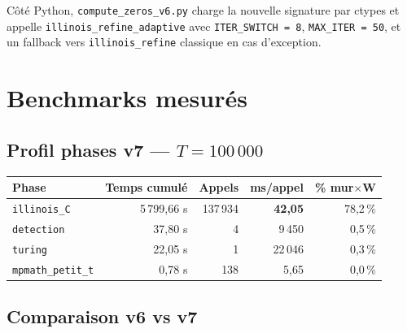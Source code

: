 \documentclass[11pt,a4paper]{article}
\begin{document}
Côté Python, \texttt{compute\_zeros\_v6.py} charge la nouvelle signature par ctypes
et appelle \texttt{illinois\_refine\_adaptive} avec \texttt{ITER\_SWITCH = 8},
\texttt{MAX\_ITER = 50}, et un fallback vers \texttt{illinois\_refine} classique en cas
d'exception.

\section{Benchmarks mesurés}

\subsection{Profil phases v7 --- $T = 100\,000$}

\begin{center}
\begin{tabular}{lrrrr}
\toprule
Phase & Temps cumulé & Appels & ms/appel & \% mur$\times$W \\
\midrule
\texttt{illinois\_C} & 5\,799,66 s & 137\,934 & \textbf{42,05} & 78,2\,\% \\
\texttt{detection}   &    37,80 s  & 4         & 9\,450 & 0,5\,\% \\
\texttt{turing}      &    22,05 s  & 1         & 22\,046 & 0,3\,\% \\
\texttt{mpmath\_petit\_t} & 0,78 s & 138       & 5,65  & 0,0\,\% \\
\bottomrule
\end{tabular}
\end{center}

\subsection{Comparaison v6 vs v7}
\end{document}
